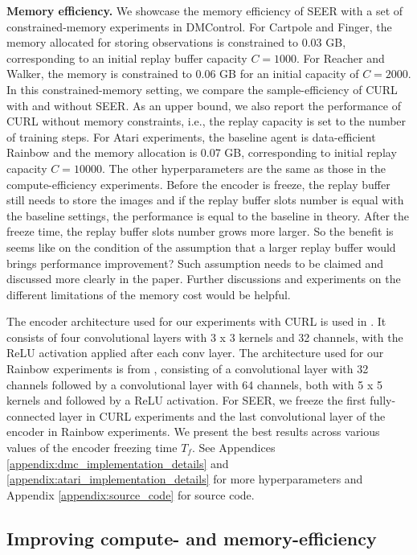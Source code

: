 \documentclass{article}
\begin{document}
\textbf{Memory efficiency.} We showcase the memory efficiency of SEER with a set of constrained-memory experiments in DMControl. For Cartpole and Finger, the memory allocated for storing observations is constrained to 0.03 GB, corresponding to an initial replay buffer capacity $C=1000$. For Reacher and Walker, the memory is constrained to 0.06 GB for an initial capacity of $C=2000$. In this constrained-memory setting, we compare the sample-efficiency of CURL with and without SEER.
As an upper bound, we also report the performance of CURL without memory constraints, i.e., the replay capacity is set to the number of training steps.
For Atari experiments,
the baseline agent is data-efficient Rainbow and the memory allocation is 0.07 GB, corresponding to initial replay capacity $C=10000$. 
The other hyperparameters are the same as those in the compute-efficiency experiments. 
Before the encoder is freeze, the replay buffer still needs to store the images and if the replay buffer slots number is equal with the baseline settings, the performance is equal to the baseline in theory. After the freeze time, the replay buffer slots number grows more larger. So the benefit is seems like on the condition of the assumption that a larger replay buffer would brings performance improvement? Such assumption needs to be claimed and discussed more clearly in the paper. Further discussions and experiments on the different limitations of the memory cost would be helpful.

The encoder architecture used for our experiments with CURL is used in \citet{yarats2019improving}. It consists of four convolutional layers
with 3 x 3 kernels and 32 channels, with the ReLU activation applied after each conv layer. The architecture used for our Rainbow experiments is from \citet{van2019use}, consisting of a convolutional layer with 32 channels followed by a convolutional layer with 64 channels, both with 5 x 5 kernels and followed by a ReLU activation. For SEER, we freeze the first fully-connected layer in CURL experiments and the last convolutional layer of the encoder in Rainbow experiments. We present the best results across various values of the encoder freezing time $T_f$. See Appendices \ref{appendix:dmc_implementation_details} and  \ref{appendix:atari_implementation_details} for more hyperparameters and Appendix \ref{appendix:source_code} for source code.

\subsection{Improving compute- and memory-efficiency} \label{main_exps}
\end{document}
